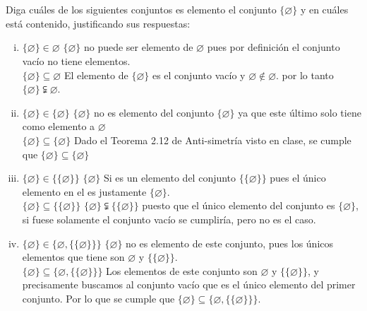 \section{}
Diga cuáles de los siguientes conjuntos es elemento el conjunto $\{ \varnothing \}$ y en cuáles está contenido, justificando sus respuestas:
\begin{enumerate}[(i)]
\item   $\{ \varnothing \} \in \varnothing$ \newline
			$\{ \varnothing \}$ no puede ser elemento de  $\varnothing$ pues por definición el conjunto vacío no tiene elementos. \newline\\
			$\{ \varnothing \} \subseteq \varnothing$\newline
			El elemento de $\{ \varnothing \}$ es el conjunto vacío y $ \varnothing  \notin \varnothing$. por lo tanto $\{\varnothing\}  \subsetneqq \varnothing$.
			
			\item $\{ \varnothing \} \in \{ \varnothing \}$ \newline
			$\{ \varnothing \}$ no es elemento del conjunto $\{ \varnothing \}$ ya que este último solo tiene como elemento a $\varnothing$ \newline \\
			$\{ \varnothing \} \subseteq \{ \varnothing \}$\newline
			Dado el Teorema 2.12 de Anti-simetría visto en clase, se cumple que $\{ \varnothing \} \subseteq \{ \varnothing \}$
			
			\item  $\{ \varnothing \} \in \{\{ \varnothing \}\}$ \newline
			$\{ \varnothing \}$ Si es un elemento del conjunto $\{\{ \varnothing \}\}$ pues el único elemento en el es justamente $\{ \varnothing \}$.\newline\\
			$\{ \varnothing \} \subseteq \{\{ \varnothing \}\}$\newline
			$\{ \varnothing \} \subsetneqq \{\{ \varnothing \}\}$ puesto que el único elemento del conjunto es $\{\varnothing\}$, si fuese solamente el conjunto vacío se cumpliría, pero no es el caso.
			
			\item  $\{ \varnothing \} \in \{ \varnothing , \{\{ \varnothing \}\}\}$\newline
			 $\{ \varnothing \}$ no es elemento de este conjunto, pues los únicos elementos que tiene son $\varnothing$ y  $\{\{ \varnothing \}\}$.\newline\\
			 $\{ \varnothing \} \subseteq \{ \varnothing , \{\{ \varnothing \}\}\}$\newline
			 Los elementos de este conjunto son $\varnothing$ y $\{\{ \varnothing \}\}$, y precisamente buscamos al conjunto vacío que es el único elemento del primer conjunto. Por lo que se cumple que  $\{ \varnothing \} \subseteq \{ \varnothing , \{\{ \varnothing \}\}\}$.
\end{enumerate}